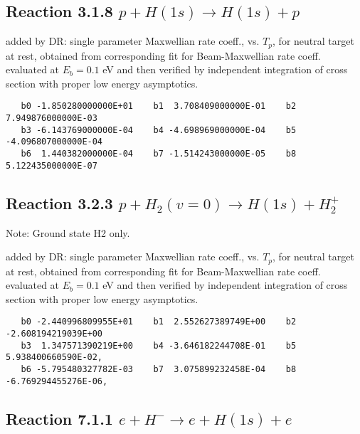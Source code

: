 \documentclass[12pt,dvipdfmx]{article}
\begin{document}
\newpage

\subsection{
Reaction 3.1.8 $  p + H(1s) \rightarrow H(1s) + p$}

added by DR: single parameter Maxwellian rate coeff., vs. $T_p$, for neutral target at rest,
obtained from corresponding fit for Beam-Maxwellian rate coeff. evaluated at $E_b =0.1$ eV
and then verified by independent integration of cross section with proper low energy asymptotics.

\begin{small}\begin{verbatim}
   b0 -1.850280000000E+01    b1  3.708409000000E-01    b2  7.949876000000E-03
   b3 -6.143769000000E-04    b4 -4.698969000000E-04    b5 -4.096807000000E-04
   b6  1.440382000000E-04    b7 -1.514243000000E-05    b8  5.122435000000E-07
\end{verbatim}\end{small}

\subsection{
Reaction 3.2.3 $  p + H_2(v=0) \rightarrow H(1s) + H_2^+$}

Note:  Ground state H2 only.

added by DR: single parameter Maxwellian rate coeff., vs. $T_p$, for neutral target at rest,
obtained from corresponding fit for Beam-Maxwellian rate coeff. evaluated at $E_b =0.1$ eV
and then verified by independent integration of cross section with proper low energy asymptotics.

\begin{small}\begin{verbatim}
   b0 -2.440996809955E+01    b1  2.552627389749E+00    b2 -2.608194219039E+00
   b3  1.347571390219E+00    b4 -3.646182244708E-01    b5  5.938400660590E-02,
   b6 -5.795480327782E-03    b7  3.075899232458E-04    b8 -6.769294455276E-06,

\end{verbatim}\end{small}

\newpage




\subsection{
Reaction 7.1.1 $   e + H^- \rightarrow e + H(1s) + e$}
\end{document}

